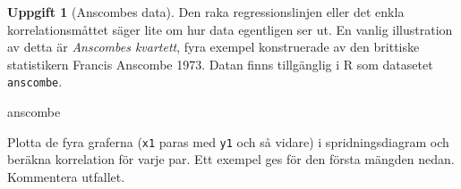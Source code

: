 \documentclass[
]{book}
\newenvironment{Shaded}{\begin{snugshade}}{\end{snugshade}}
\newcommand{\FunctionTok}[1]{\textcolor[rgb]{0.13,0.29,0.53}{\textbf{#1}}}
\newcommand{\NormalTok}[1]{#1}
\newcommand{\SpecialCharTok}[1]{\textcolor[rgb]{0.81,0.36,0.00}{\textbf{#1}}}
\theoremstyle{definition}
\theoremstyle{definition}
\theoremstyle{definition}
\newtheorem{exercise}{Uppgift}[chapter]
\theoremstyle{definition}
\theoremstyle{remark}
\begin{document}
\begin{exercise}[Anscombes data]

Den raka regressionslinjen eller det enkla korrelationsmåttet säger lite om hur data egentligen ser ut. En vanlig illustration av detta är \emph{Anscombes kvartett}, fyra exempel konstruerade av den brittiske statistikern Francis Anscombe 1973. Datan finns tillgänglig i R som datasetet \texttt{anscombe}.

\begin{Shaded}
\begin{Highlighting}[]
\NormalTok{anscombe}
\end{Highlighting}
\end{Shaded}

Plotta de fyra graferna (\texttt{x1} paras med \texttt{y1} och så vidare) i spridningsdiagram och beräkna korrelation för varje par. Ett exempel ges för den första mängden nedan. Kommentera utfallet.

\begin{Shaded}
\end{Shaded}

\end{exercise}
\end{document}
